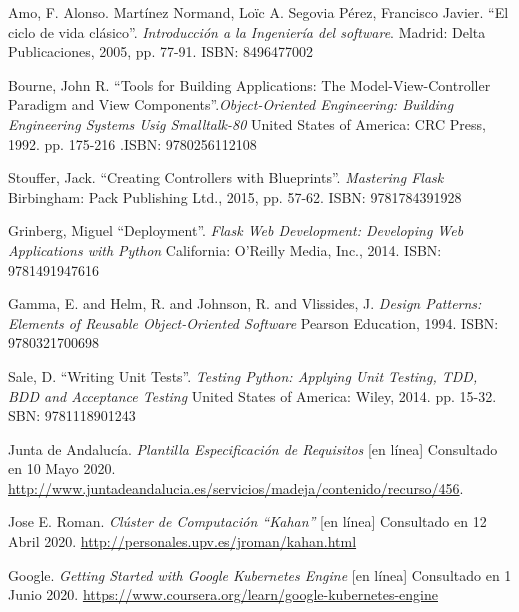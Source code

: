 \documentclass[11pt,spanish,listoffigures,listoftables]{tfgetsinf}
\begin{document}
\begin{thebibliography}{10}
	Amo, F. Alonso. Martínez Normand, Loïc A. Segovia Pérez, Francisco Javier.
	\newblock ``El ciclo de vida clásico''. \textit{Introducción a la Ingeniería del software}.
	\newblock Madrid: Delta Publicaciones, 2005, pp. 77-91. ISBN: 8496477002
	
	Bourne, John R.
	\newblock ``Tools for Building Applications: The Model-View-Controller Paradigm and View Components''.\textit{Object-Oriented Engineering: Building Engineering Systems Usig Smalltalk-80}
	\newblock United States of America: CRC Press, 1992. pp. 175-216 .ISBN: 9780256112108
	
	Stouffer, Jack.
	\newblock ``Creating Controllers with Blueprints''. \textit{Mastering Flask}
	\newblock Birbingham: Pack Publishing Ltd., 2015, pp. 57-62. ISBN: 9781784391928
	
	
	Grinberg, Miguel
	\newblock ``Deployment''. \textit{Flask Web Development: Developing Web Applications with Python}
	\newblock California: O'Reilly Media, Inc., 2014. ISBN: 9781491947616
	
	Gamma, E. and Helm, R. and Johnson, R. and Vlissides, J.
	\newblock \textit{Design Patterns: Elements of Reusable Object-Oriented Software}
	\newblock Pearson Education, 1994. ISBN: 9780321700698
	
	Sale, D.
	\newblock ``Writing Unit Tests''. \textit{Testing Python: Applying Unit Testing, TDD, BDD and Acceptance Testing}
	\newblock United States of America: Wiley, 2014. pp. 15-32. SBN: 9781118901243


   Junta de Andalucía. \textit{Plantilla Especificación de Requisitos} [en línea]
   \newblock Consultado en 10 Mayo 2020.
   \url{http://www.juntadeandalucia.es/servicios/madeja/contenido/recurso/456}.

	Jose E. Roman. \textit{Clúster de Computación ``Kahan''} [en línea]
	\newblock Consultado en 12 Abril 2020.
	\url{http://personales.upv.es/jroman/kahan.html}
	
	Google. \textit{Getting Started with Google Kubernetes Engine} [en línea]
	\newblock Consultado en 1 Junio 2020.
	\url{https://www.coursera.org/learn/google-kubernetes-engine}
	

\end{thebibliography}
\end{document}
